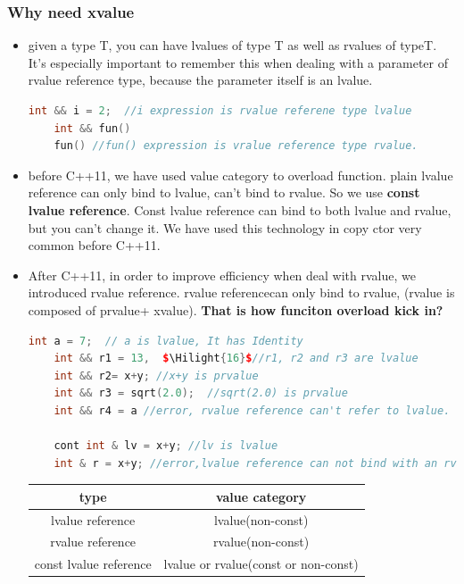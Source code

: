 \documentclass[a4paper,12pt,twoside]{book}
\newcommand{\Hilight}[1]{\makebox[0pt][l]{\color{yellow}\rule[-3pt]{#1em}{11pt}}}
\begin{document}
\subsubsection{Why need xvalue}
\begin{itemize}
	\item given a type T, you can have lvalues of type T as well as rvalues of typeT. It's especially important to remember this when dealing with a parameter of rvalue reference type, because the parameter itself is an lvalue.
	\begin{lstlisting}[frame=single, language=c++, mathescape=true]
	int && i = 2;  //i expression is rvalue referene type lvalue
	int && fun()
	fun() //fun() expression is vralue reference type rvalue. 
	\end{lstlisting}
	
	\item before C++11, we have used value category to overload function. plain lvalue reference can only bind to lvalue, can't bind to rvalue. So we use \textbf{const lvalue reference}.  Const lvalue reference can bind to both lvalue and rvalue, but you can't change it. We have used this technology in copy ctor very common before C++11.
	
	\item After C++11, in order to improve efficiency when deal with rvalue, we introduced rvalue reference.  rvalue referencecan only bind to rvalue, (rvalue is composed of prvalue+ xvalue). \textbf{That is how funciton overload kick in?}
	
	\begin{lstlisting}[frame=single, language=c++, mathescape=true]
	int a = 7;  // a is lvalue, It has Identity
	int && r1 = 13,  $\Hilight{16}$//r1, r2 and r3 are lvalue
	int && r2= x+y; //x+y is prvalue
	int && r3 = sqrt(2.0);  //sqrt(2.0) is prvalue
	int && r4 = a //error, rvalue reference can't refer to lvalue.
	
	cont int & lv = x+y; //lv is lvalue
	int & r = x+y; //error,lvalue reference can not bind with an rvalue.
	\end{lstlisting}
	
	\begin{tabular}{|c|c|}
		\hline 
		type & value category \\ 
		\hline 
		lvalue reference & lvalue(non-const)  \\ 
		\hline 
		rvalue reference &  rvalue(non-const)\\ 
		\hline 
		const lvalue reference & lvalue or rvalue(const or non-const)  \\ 
		\hline 
	\end{tabular} 
	

\end{itemize}
\end{document}
